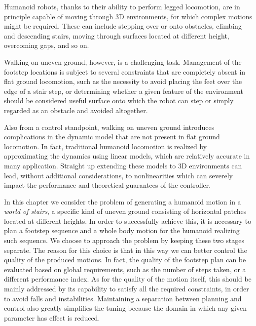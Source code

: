 Humanoid robots, thanks to their ability to perform legged locomotion, are in principle capable of moving through 3D environments, for which complex motions might be required. These can include stepping over or onto obstacles, climbing and descending stairs, moving through surfaces located at different height, overcoming gaps, and so on.

Walking on uneven ground, however, is a challenging task. Management of the footstep locations is subject to several constraints that are completely absent in flat ground locomotion, such as the necessity to avoid placing the feet over the edge of a stair step, or determining whether a given feature of the environment should be considered useful surface onto which the robot can step or simply regarded as an obstacle and avoided altogether.

Also from a control standpoint, walking on uneven ground introduces complications in the dynamic model that are not present in flat ground locomotion. In fact, traditional humanoid locomotion is realized by approximating the dynamics using linear models, which are relatively accurate in many application. Straight up extending these models to 3D environments can lead, without additional considerations, to nonlinearities which can severely impact the performance and theoretical guarantees of the controller.

In this chapter we consider the problem of generating a humanoid motion in a \textit{world of stairs}, a specific kind of uneven ground consisting of horizontal patches located at different heights. In order to successfully achieve this, it is necessary to plan a footstep sequence and a whole body motion for the humanoid realizing such sequence. We choose to approach the problem by keeping these two stages separate. The reason for this choice is that in this way we can better control the quality of the produced motions. In fact, the quality of the footstep plan can be evaluated based on global requirements, such as the number of steps taken, or a different performance index. As for the quality of the motion itself, this should be mainly addressed by its capability to satisfy all the required constraints, in order to avoid falls and instabilities. Maintaining a separation between planning and control also greatly simplifies the tuning because the domain in which any given parameter has effect is reduced.

